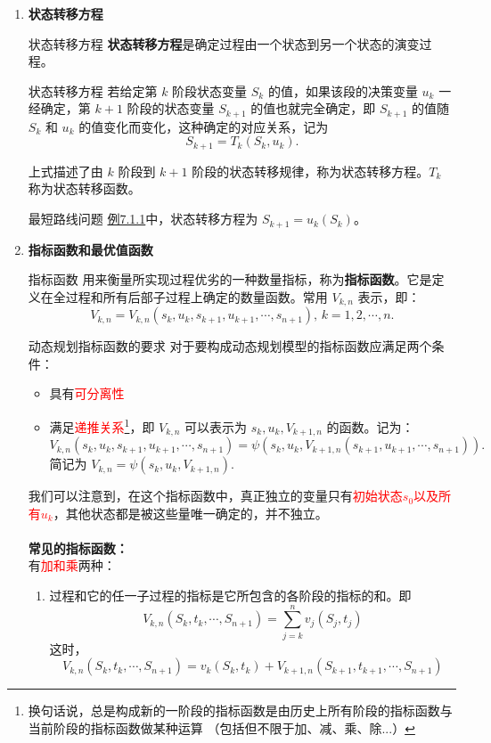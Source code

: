 \begin{enumerate}
\item {\textbf{状态转移方程}}
\begin{dfnbox}{状态转移方程}{}
	\label{dfn:状态转移方程}
	\textbf{状态转移方程}是确定过程由一个状态到另一个状态的演变过程。
\end{dfnbox}
\begin{thmbox}{状态转移方程}{}
若给定第 \( k \) 阶段状态变量 \( S_k \) 的值，如果该段的决策变量 \( u_k \) 一经确定，第 \( k+1 \) 阶段的状态变量 \( S_{k+1} \) 的值也就完全确定，即 \( S_{k+1} \) 的值随 \( S_k \) 和 \( u_k \) 的值变化而变化，这种确定的对应关系，记为
\[S_{k+1} = T_k (S_k, u_k).\]

上式描述了由 \( k \) 阶段到 \( k+1 \) 阶段的状态转移规律，称为状态转移方程。\( T_k \) 称为状态转移函数。
\end{thmbox}
\begin{exbox}{最短路线问题}{}
\hyperref[eg:7.1.1]{例7.1.1}中，状态转移方程为 \( S_{k+1} = u_k (S_k) \)。
\end{exbox}
\item \textbf{指标函数和最优值函数}
\begin{dfnbox}{指标函数}{}
用来衡量所实现过程优劣的一种数量指标，称为\textbf{指标函数}。它是定义在全过程和所有后部子过程上确定的数量函数。常用 \( V_{k,n} \) 表示，即：
\[V_{k,n} = V_{k,n}(s_k, u_k, s_{k+1}, u_{k+1}, \cdots, s_{n+1}), \, k = 1, 2, \cdots, n.\]
\end{dfnbox}
\begin{thmbox}{动态规划指标函数的要求}{}
对于要构成动态规划模型的指标函数应满足两个条件：
\begin{itemize}
\item 具有\textcolor{red}{可分离性}
\item 满足\textcolor{red}{递推关系}\footnote{换句话说，总是构成新的一阶段的指标函数是由历史上所有阶段的指标函数与当前阶段的指标函数做某种运算 （包括但不限于加、减、乘、除...）}，即 \( V_{k,n} \) 可以表示为 \( s_k, u_k, V_{k+1,n} \) 的函数。记为：
\[V_{k,n}(s_k, u_k, s_{k+1}, u_{k+1}, \cdots, s_{n+1}) = \psi(s_k, u_k, V_{k+1,n}(s_{k+1}, u_{k+1}, \cdots, s_{n+1})).\]
简记为 \( V_{k,n} = \psi(s_k, u_k, V_{k+1,n}). \)
\end{itemize}
\end{thmbox}
我们可以注意到，在这个指标函数中，真正独立的变量只有\textcolor{red}{初始状态$s_0$以及所有$u_k$}，其他状态都是被这些量唯一确定的，并不独立。
\\\\\textbf{常见的指标函数：}\\
有\textcolor{red}{加和乘}两种：
\begin{enumerate}[label=(\arabic*)]
    \item 过程和它的任一子过程的指标是它所包含的各阶段的指标的和。即
    \[V_{k,n}(S_k, t_k, \cdots, S_{n+1}) = \sum_{j=k}^{n} v_j(S_j, t_j)\]
    这时，
    \[V_{k,n}(S_k, t_k, \cdots, S_{n+1}) = v_k(S_k, t_k) + V_{k+1,n}(S_{k+1}, t_{k+1}, \cdots, S_{n+1})\]
    

\end{enumerate}
\end{enumerate}
